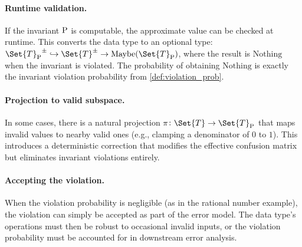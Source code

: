 \documentclass[ ../main.tex]{subfiles}
\begin{document}
\paragraph{Runtime validation.}
If the invariant $\Fun{P}$ is computable, the approximate value can be checked at runtime.
This converts the data type to an optional type: $\AT{\Set{T}_{\Fun{P}}} \hookrightarrow \AT{\Set{T}} \to \mathrm{Maybe}(\Set{T}_{\Fun{P}})$, where the result is $\mathrm{Nothing}$ when the invariant is violated.
The probability of obtaining $\mathrm{Nothing}$ is exactly the invariant violation probability from \cref{def:violation_prob}.

\paragraph{Projection to valid subspace.}
In some cases, there is a natural projection $\pi \colon \Set{T} \to \Set{T}_{\Fun{P}}$ that maps invalid values to nearby valid ones (e.g., clamping a denominator of $0$ to $1$).
This introduces a deterministic correction that modifies the effective confusion matrix but eliminates invariant violations entirely.

\paragraph{Accepting the violation.}
When the violation probability is negligible (as in the rational number example), the violation can simply be accepted as part of the error model.
The data type's operations must then be robust to occasional invalid inputs, or the violation probability must be accounted for in downstream error analysis.
\end{document}
